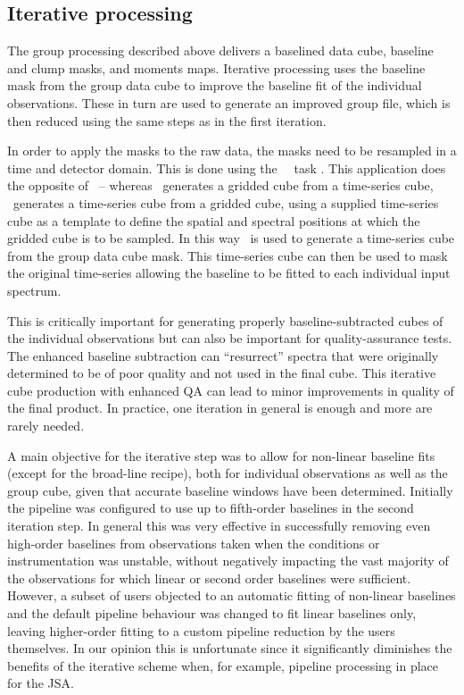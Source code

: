 \documentclass[final,authoryear,5p,times,twocolumn]{elsarticle}
\begin{document}
\subsection{Iterative processing}

The group processing described above delivers a baselined data cube,
baseline and clump masks, and moments maps. Iterative processing uses
the baseline mask from the group data cube to improve the baseline fit
of the individual observations. These in turn are used to generate an improved
group file, which is then reduced using the same steps as in the first iteration.

In order to apply the masks to the raw data, the masks need to be resampled
in a time and detector domain. This is done using the \smurf\ \unmakecube\ task
\citep[][]{SUN258}. This application
does the opposite of \makecube\ -- whereas \makecube\
generates a gridded cube from a time-series cube, \unmakecube\ generates
a time-series cube from a gridded cube, using a supplied time-series cube
as a template to define the spatial and spectral positions at which the
gridded cube is to be sampled. In this way \unmakecube\ is used to generate
a time-series cube from the group data cube mask. This time-series cube can
then be used to mask the original time-series allowing the baseline to be
fitted to each individual input spectrum.

This is critically important for generating properly baseline-subtracted
cubes of the individual observations but can also
be important for quality-assurance tests. The enhanced baseline
subtraction can ``resurrect'' spectra that were originally determined
to be of poor quality and not used in the final cube. This iterative
cube production with enhanced QA can lead to minor improvements in
quality of the final product.  In practice, one iteration in general is enough
and more are rarely needed.

A main objective for the iterative step was to allow for non-linear baseline fits
(except for the broad-line recipe), both for individual observations as well as
the group cube, given that accurate baseline windows have been determined.
Initially the pipeline was configured to use up to fifth-order baselines in
the second iteration step. In general this was very effective in successfully
removing even high-order baselines from observations taken when the
conditions or instrumentation was unstable, without negatively impacting
the vast majority of the observations for which linear or second order baselines
were sufficient.  However, a subset of users objected to an automatic fitting of
non-linear baselines and the default pipeline behaviour was changed to
fit linear baselines only, leaving higher-order fitting to a custom pipeline reduction
by the users themselves.  In our opinion this is unfortunate since it significantly
diminishes the benefits of the iterative scheme when, for example, pipeline processing
in place for the JSA.
\end{document}
